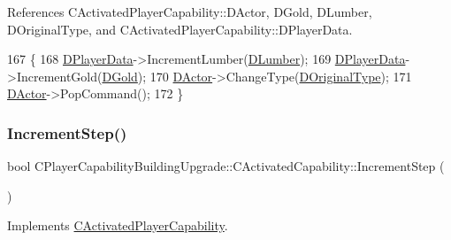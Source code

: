 References C\+Activated\+Player\+Capability\+::\+D\+Actor, D\+Gold, D\+Lumber, D\+Original\+Type, and C\+Activated\+Player\+Capability\+::\+D\+Player\+Data.


\begin{DoxyCode}
167                                                                  \{
168     \hyperlink{classCActivatedPlayerCapability_a9bf27c322a73f4b11c8183cc1973c3d8}{DPlayerData}->IncrementLumber(\hyperlink{classCPlayerCapabilityBuildingUpgrade_1_1CActivatedCapability_a497437c6eb755ccc9b18ff2a1e704c72}{DLumber});
169     \hyperlink{classCActivatedPlayerCapability_a9bf27c322a73f4b11c8183cc1973c3d8}{DPlayerData}->IncrementGold(\hyperlink{classCPlayerCapabilityBuildingUpgrade_1_1CActivatedCapability_a86bea8030ade6995b4bb5b253fe9466c}{DGold});
170     \hyperlink{classCActivatedPlayerCapability_a54ca944b47bff2718330639941d402b0}{DActor}->ChangeType(\hyperlink{classCPlayerCapabilityBuildingUpgrade_1_1CActivatedCapability_a9418eb8f3401f341c688f00cf8c4aa53}{DOriginalType});
171     \hyperlink{classCActivatedPlayerCapability_a54ca944b47bff2718330639941d402b0}{DActor}->PopCommand();
172 \}
\end{DoxyCode}
\hypertarget{classCPlayerCapabilityBuildingUpgrade_1_1CActivatedCapability_acc732144e87e5fc88117c0b3a032a97a}{}\label{classCPlayerCapabilityBuildingUpgrade_1_1CActivatedCapability_acc732144e87e5fc88117c0b3a032a97a} 
\subsubsection{\texorpdfstring{Increment\+Step()}{IncrementStep()}}
{\footnotesize\ttfamily bool C\+Player\+Capability\+Building\+Upgrade\+::\+C\+Activated\+Capability\+::\+Increment\+Step (\begin{DoxyParamCaption}{ }\end{DoxyParamCaption})\hspace{0.3cm}{\ttfamily [virtual]}}



Implements \hyperlink{classCActivatedPlayerCapability_a943b5999a57504399293250382c0ec6a}{C\+Activated\+Player\+Capability}.



